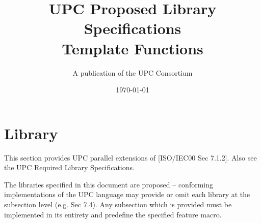 \newcommand{\myspecversion}{Version 1.3}
\newcommand{\mydraftversion}{Draft 3.3}
\newcommand{\myversion}{\specversion}
\newcommand{\mytitle}{UPC Proposed Library Specifications\\
                      Template Functions}


\makeindex

\title{\mytitle\\
\myversion}

\author{A publication of the UPC Consortium}

\date{\today}



\maketitle

\setcounter{page}{2}
\dotoc

\setcounter{section}{6} %
\section{Library}

\npf This section provides UPC parallel extensions of [ISO/IEC00 Sec 7.1.2]. Also see the UPC Required Library Specifications.

\np The libraries specified in this document are proposed --
conforming implementations of the UPC language may provide or 
omit each library at the subsection level (e.g. Sec 7.4). 
Any subsection which is provided must be implemented in its
entirety and predefine the specified feature macro.

\setcounter{subsection}{9} %


\doindex

